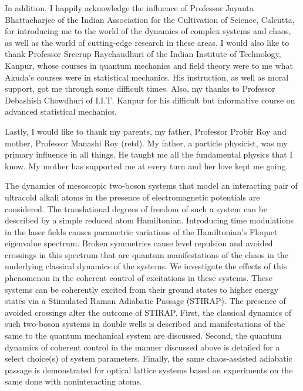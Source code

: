 \documentclass[12pt]{report}	%
\theoremstyle{definition}
\theoremstyle{remark}
\begin{document}
\begin{acknowledgments}
In addition, I happily acknowledge the influence of Professor Jayanta Bhattacharjee of the Indian Association for the Cultivation of Science, Calcutta, for introducing me to the world of the dynamics of complex systems and chaos, as well as the world of cutting-edge research in these areas. I would also like to thank Professor Sreerup Raychaudhuri of the Indian Institute of Technology, Kanpur, whose courses in quantum mechanics and field theory were to me what Akuda's courses were in statistical mechanics. His instruction, as well as moral support, got me through some difficult times. Also, my thanks to Professor Debashish Chowdhuri of I.I.T. Kanpur for his difficult but informative course on advanced statistical mechanics.

Lastly, I would like to thank my parents, my father, Professor Probir Roy and  mother, Professor Manashi Roy (retd). My father, a particle physicist, was my primary influence in all things. He taught me all the fundamental physics that I know. My mother has supported me at every turn and her love kept me going.

\end{acknowledgments}


%
\utabstract
{}%
\indent
The dynamics of mesoscopic two-boson systems that model an interacting pair of ultracold alkali atoms in the presence of electromagnetic potentials are considered. The translational degrees of freedom of such a system can be described by a simple reduced atom Hamiltonian. Introducing time modulations in the laser fields causes parametric variations of the Hamiltonian's Floquet eigenvalue spectrum. Broken symmetries cause level repulsion and avoided crossings in this spectrum that are quantum manifestations of the chaos in the underlying classical dynamics of the systems. We investigate the effects of this phenomenon in the coherent control of excitations in these systems. These systems can be coherently excited from their ground states to higher energy states via a Stimulated Raman Adiabatic Passage (STIRAP). The presence of avoided crossings alter the outcome of STIRAP. First, the classical dynamics of such two-boson systems in double wells is described and manifestations of the same to the quantum mechanical system are discussed. Second, the quantum dynamics of coherent control in the manner discussed above is detailed for a select choice(s) of system parameters. Finally, the same chaos-assisted adiabatic passage is demonstrated for optical lattice systems based on experiments on the same done with noninteracting atoms.
\end{document}
